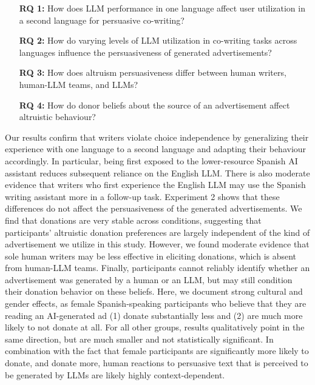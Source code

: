 \begin{framed}
\begin{itemize}
    \item [\textbf{RQ 1:}] How does LLM performance in one language affect user utilization in a second language for persuasive co-writing?

    \item [\textbf{RQ 2:}] How do varying levels of LLM utilization in co-writing tasks across languages influence the persuasiveness of generated advertisements?

    \item [\textbf{RQ 3:}]
    How does altruism persuasiveness differ between human writers, human-LLM teams, and LLMs?

    \item [\textbf{RQ 4:}] How do donor beliefs about the source of an advertisement affect altruistic behaviour?
    
\end{itemize}
\end{framed}

Our results confirm that writers violate choice independence by generalizing their experience with one language to a second language and adapting their behaviour accordingly. In particular, being first exposed to the lower-resource Spanish AI assistant reduces subsequent reliance on the English LLM. There is also moderate evidence that writers who first experience the English LLM may use the Spanish writing assistant more in a follow-up task. Experiment 2 shows that these differences do not affect the persuasiveness of the generated advertisements. We find that donations are very stable across conditions, suggesting that participants' altruistic donation preferences are largely independent of the kind of advertisement we utilize in this study. However, we found moderate evidence that sole human writers may be less effective in eliciting donations, which is absent from human-LLM teams. Finally, participants cannot reliably identify whether an advertisement was generated by a human or an LLM, but may still condition their donation behavior on these beliefs. Here, we document strong cultural and gender effects, as female Spanish-speaking participants who believe that they are reading an AI-generated ad (1) donate substantially less and (2) are much more likely to not donate at all. For all other groups, results qualitatively point in the same direction, but are much smaller and not statistically significant. In combination with the fact that female participants are significantly more likely to donate, and donate more, human reactions to persuasive text that is perceived to be generated by LLMs are likely highly context-dependent. 


